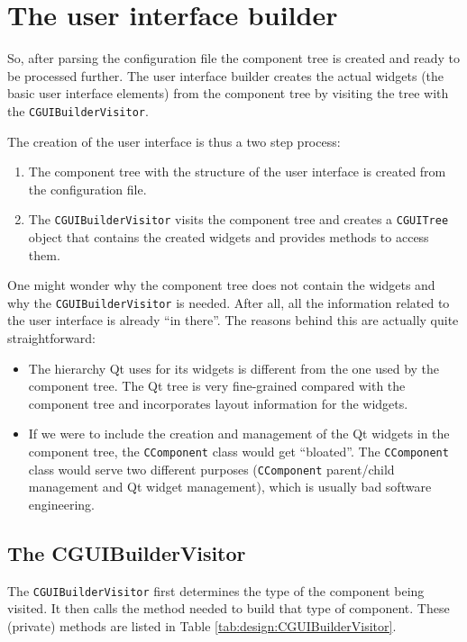 \section{The user interface builder}\label{sect:design:uibuilder}
So, after parsing the configuration file the component tree is created and
ready to be processed further. The user interface builder creates the actual
widgets (the basic user interface elements) from the component tree by visiting
the tree with the \verb=CGUIBuilderVisitor=.

The creation of the user interface is thus a two step process:
\begin{enumerate}
\item The component tree with the structure of the user interface is created
from the configuration file.
\item The \verb=CGUIBuilderVisitor= visits the component tree and creates a
\verb=CGUITree= object that contains the created widgets and provides methods
to access them.
\end{enumerate}

One might wonder why the component tree does not contain the widgets and why
the \verb=CGUIBuilderVisitor= is needed. After all, all the information related
to the user interface is already ``in there''. The reasons behind this are
actually quite straightforward:

\begin{itemize}
\item The hierarchy Qt uses for its widgets is different from the one used by
the component tree. The Qt tree is very fine-grained compared with the
component tree and incorporates layout information for the widgets.
\item If we were to include the creation and management of the Qt widgets in
the component tree, the \verb=CComponent= class would get ``bloated''. The
\verb=CComponent= class would serve two different purposes (\verb=CComponent=
parent/child management and Qt widget management), which is usually bad
software engineering.
\end{itemize}

\subsection{The CGUIBuilderVisitor}
The \verb=CGUIBuilderVisitor= first determines the type of the component being
visited. It then calls the method needed to build that type of component. These
(private) methods are listed in Table \ref{tab:design:CGUIBuilderVisitor}.

